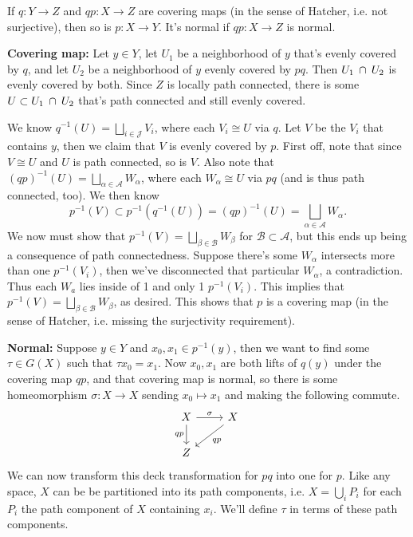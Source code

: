 \documentclass[twoside,10pt]{article}
\begin{document}

\begin{exer}[1.3: 16]
	If $q:Y\to Z$ and $qp:X\to Z$ are covering maps (in the sense of Hatcher, i.e. not surjective), then so is $p:X\to Y$. It's normal if $qp:X\to Z$ is normal.
\end{exer}

\textbf{Covering map:} Let $y \in Y$, let $U_1$ be a neighborhood of $y$ that's evenly covered by $q$, and let $U_2$ be a neighborhood of $y$ evenly covered by $pq$. Then $U_1 \operatorname{\;\cap\;} U_2$ is evenly covered by both. Since $Z$ is locally path connected, there is some $U \subset U_1 \operatorname{\;\cap\;} U_2$ that's path connected and still evenly covered.

We know $q^{-1}(U) = \bigsqcup_{i \in \mathcal{J}} V_i$, where each $V_i \cong U$ via $q$. Let $V$ be the $V_i$ that contains $y$, then we claim that $V$ is evenly covered by $p$. First off, note that since $V \cong U$ and $U$ is path connected, so is $V$. Also note that $(qp)^{-1}(U) = \bigsqcup_{\alpha \in \mathcal{A}}W_{\alpha}$, where each $W_{\alpha}\cong U$ via $pq$ (and is thus path connected, too). We then know
\[
	p^{-1}(V) \subset p^{-1}(q^{-1}(U)) = (qp)^{-1}(U) = \bigsqcup_{\alpha \in \mathcal{A}}W_{\alpha}.
\] We now must show that $p^{-1}(V) = \bigsqcup_{\beta \in \mathcal{B}}W_\beta$ for $\mathcal{B} \subset \mathcal{A}$, but this ends up being a consequence of path connectedness. Suppose there's some $W_{\alpha}$ intersects more than one $p^{-1}(V_i)$, then we've disconnected that particular $W_\alpha$, a contradiction. Thus each $W_a$ lies inside of 1 and only 1 $p^{-1}(V_i)$. This implies that $p^{-1}(V) = \bigsqcup_{\beta \in \mathcal{B}}W_\beta$, as desired. This shows that $p$ is a covering map (in the sense of Hatcher, i.e. missing the surjectivity requirement).

\textbf{Normal:} Suppose $y \in Y$ and $x_0,x_1 \in p^{-1}(y)$, then we want to find some $\tau \in G(X)$ such that $\tau x_0 = x_1$. Now $x_0,x_1$ are both lifts of $q(y)$ under the covering map $qp$, and that covering map is normal, so there is some homeomorphism $\sigma:X\to X$ sending $x_0 \mapsto x_1$ and making the following commute.
\[
\begin{tikzcd}
	X \rar{\sigma}\dar["qp"'] & X \arrow[dl,"qp"] \\
	Z
\end{tikzcd}
\] 
We can now transform this deck transformation for $pq$ into one for $p$. Like any space, $X$ can be be partitioned into its path components, i.e. $X = \bigcup_{i} P_i$ for each $P_i$ the path component of $X$ containing $x_i$. We'll define $\tau$ in terms of these path components.
\end{document}

